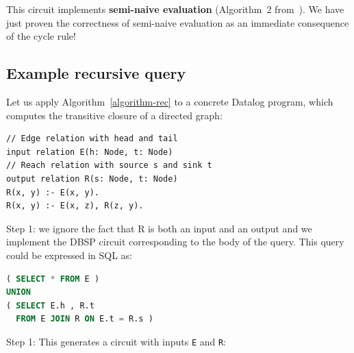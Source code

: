 \documentclass[twocolumn
]{svjour3}
\numberwithin{equation}{section}
\newcommand{\dbsp}{DBSP\xspace}
\newcommand{\defined}[1]{\textbf{#1}\index{}}
\newcommand{\code}[1]{\mbox{\texttt{#1}}}
\newcommand{\distinct}{\mathit{dist}}  %
\newcommand{\secref}[1]{\S\ref{#1}}  %
\newcommand{\refsec}[1]{\secref{#1}}
\begin{document}
This circuit implements \defined{semi-naive evaluation}
(Algorithm~2 from~\cite{greco-sldm15}).  We have just proven the
correctness of semi-naive evaluation as an immediate consequence
of the cycle rule!


\vspace{-3ex}
%
\subsection{Example recursive query}\label{sec:recursive-example}

Let us apply Algorithm~\ref{algorithm-rec} to a concrete Datalog
program, which computes the transitive closure of a directed graph:

\begin{lstlisting}[language=ddlog,basicstyle=\small\ttfamily]
// Edge relation with head and tail
input relation E(h: Node, t: Node)
// Reach relation with source s and sink t
output relation R(s: Node, t: Node)
R(x, y) :- E(x, y).
R(x, y) :- E(x, z), R(z, y).
\end{lstlisting}

Step 1: we ignore the fact that R is both an input and an output and we implement
the \dbsp circuit corresponding to the body of the query.  This query could be expressed
in SQL as:

\begin{lstlisting}[language=SQL,basicstyle=\small\ttfamily]
( SELECT * FROM E )
UNION
( SELECT E.h , R.t
  FROM E JOIN R ON E.t = R.s )
\end{lstlisting}

\noindent Step 1:
This generates a circuit with inputs \code{E} and \code{R}:

\end{document}
